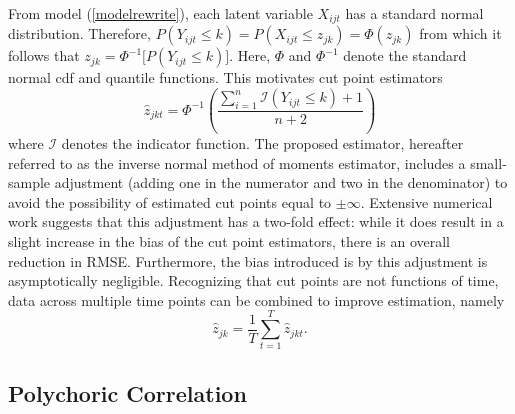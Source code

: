 \documentclass[12pt]{article}
\begin{document}
From model (\ref{modelrewrite}), each latent variable $X_{ijt}$ has a standard normal distribution. Therefore, $P(Y_{ijt}\leq k)=P(X_{ijt} \leq z_{jk})=\Phi (z_{jk})$ from which
it follows that $z_{jk}=\Phi^{-1}\lbrack P(Y_{ijt}\leq k) \rbrack$. Here, $%
\Phi$ and $\Phi^{-1}$ denote the standard normal cdf and quantile functions.
This motivates cut point estimators 
\begin{equation}  \label{z_hat_part1}
\hat{z}_{jkt} = \Phi^{-1} \left( \frac{ \sum_{i = 1}^n \mathcal{I} \left(
Y_{ijt} \leq k \right) + 1}{n + 2} \right)
\end{equation}
where $\mathcal{I}$ denotes the indicator function. The proposed estimator,
hereafter referred to as the inverse normal method of moments estimator, includes a small-sample adjustment (adding one in the numerator and two in the
denominator) to avoid the possibility of estimated cut points equal to $ \pm \infty $. Extensive numerical work suggests that this adjustment has a two-fold effect: while it does result in a slight increase in the bias of the cut point estimators, there is an overall reduction in RMSE. Furthermore, the
bias introduced is by this adjustment is asymptotically negligible. Recognizing that cut points are not functions of time, data across multiple time points can be combined to improve estimation, namely 
\begin{equation}  \label{z_hat_part2}
\hat{z}_{jk} = \frac{1}{T} \sum_{t = 1}^T \hat{z}_{jkt}.
\end{equation}

\subsection{Polychoric Correlation}
\end{document}
